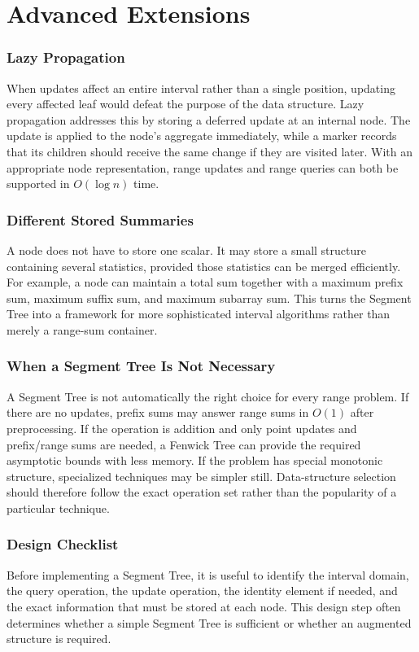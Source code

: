 \documentclass[11pt,open=any]{scrreprt}
\begin{document}
\chapter{Advanced Extensions}

\subsection{Lazy Propagation}
When updates affect an entire interval rather than a single position, updating every affected leaf would defeat the purpose of the data structure. Lazy propagation addresses this by storing a deferred update at an internal node. The update is applied to the node's aggregate immediately, while a marker records that its children should receive the same change if they are visited later. With an appropriate node representation, range updates and range queries can both be supported in $O(\log n)$ time.

\subsection{Different Stored Summaries}
A node does not have to store one scalar. It may store a small structure containing several statistics, provided those statistics can be merged efficiently. For example, a node can maintain a total sum together with a maximum prefix sum, maximum suffix sum, and maximum subarray sum. This turns the Segment Tree into a framework for more sophisticated interval algorithms rather than merely a range-sum container.

\subsection{When a Segment Tree Is Not Necessary}
A Segment Tree is not automatically the right choice for every range problem. If there are no updates, prefix sums may answer range sums in $O(1)$ after preprocessing. If the operation is addition and only point updates and prefix/range sums are needed, a Fenwick Tree can provide the required asymptotic bounds with less memory. If the problem has special monotonic structure, specialized techniques may be simpler still. Data-structure selection should therefore follow the exact operation set rather than the popularity of a particular technique.

\subsection{Design Checklist}
Before implementing a Segment Tree, it is useful to identify the interval domain, the query operation, the update operation, the identity element if needed, and the exact information that must be stored at each node. This design step often determines whether a simple Segment Tree is sufficient or whether an augmented structure is required.
\end{document}
